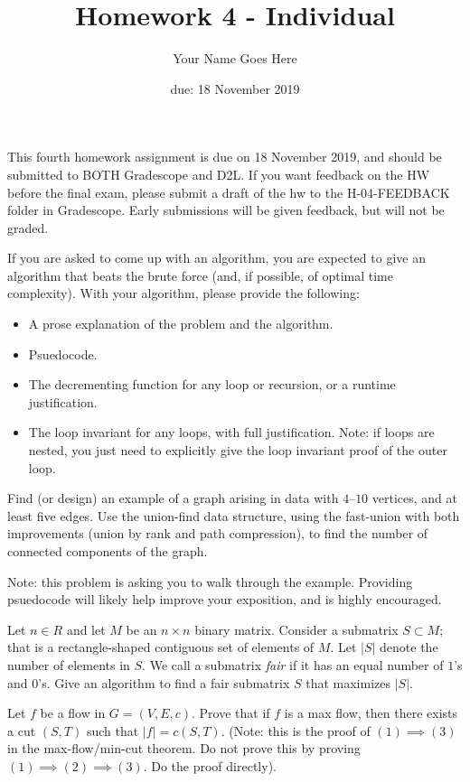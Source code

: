 \documentclass{article}
\author{Your Name Goes Here}
\date{due: 18 November 2019}
\title{Homework 4 - Individual}
\begin{document}
\maketitle

This fourth homework assignment is due on 18 November 2019, and should be
submitted to BOTH Gradescope and D2L.  If you want feedback on the HW before the
final exam, please submit a draft of the hw to the H-04-FEEDBACK folder in
Gradescope.  Early submissions will be given feedback, but will not be graded.

If you are asked to come up with an algorithm, you are expected to give an
algorithm that beats the brute force (and, if possible, of optimal time
complexity).
With your algorithm, please provide the following:
\begin{itemize}
    \item A prose explanation of the problem and the algorithm.
    \item Psuedocode.
    \item The decrementing function for any loop or recursion, or a runtime
        justification.
    \item The loop invariant for any loops, with full justification.  Note: if
        loops are nested, you just need to explicitly give the loop invariant
        proof of the outer loop.
\end{itemize}

\nextprob
Find (or design) an example of a graph arising in data
with $4$--$10$ vertices, and at least five
edges.  Use the union-find data structure, using the fast-union with both
improvements (union by rank and path compression), to find the number of
connected components of the graph.

Note: this problem is asking you to walk through the example.  Providing
psuedocode will likely help improve your exposition, and is highly encouraged.

\nextprob
Let $n \in R$ and let $M$ be an $n \times n$ binary matrix.  Consider a
submatrix $S \subset M$; that is a rectangle-shaped contiguous set of
elements of $M$.  Let $|S|$ denote the number of elements in $S$.  We call a
submatrix \emph{fair} if it has an equal number of $1$'s and $0$'s.  Give an
algorithm to find a fair submatrix $S$ that maximizes $|S|$.

\nextprob
Let $f$ be a flow in $G=(V,E,c)$.  Prove that if $f$ is a max flow, then there
exists a cut $(S,T)$ such that $|f| = c(S,T)$.  (Note: this is the proof of $(1)
\implies (3)$ in the max-flow/min-cut theorem.  Do not prove this by proving
$(1) \implies (2) \implies (3)$.  Do the proof directly).
\end{document}
